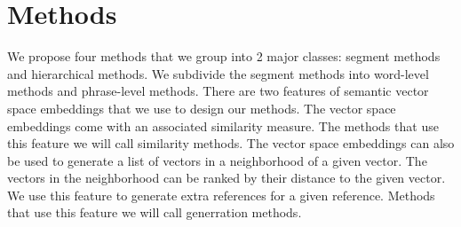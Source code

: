 
\section{Methods}
\label{sec:methods}



We propose four methods that we group into 2 major classes: segment methods and hierarchical methods. 
We subdivide the segment methods into word-level methods and phrase-level methods. 
There are two features of semantic vector space embeddings that we use to design our methods. 
The vector space embeddings come with an associated similarity measure. 
The methods that use this feature we will call similarity methods. 
The vector space embeddings can also be used to generate a list of vectors in a neighborhood of a given vector. 
The vectors in the neighborhood can be ranked by their distance to the given vector. 
We use this feature to generate extra references for a  given reference.
Methods that use this feature we will call generration methods. 
%


